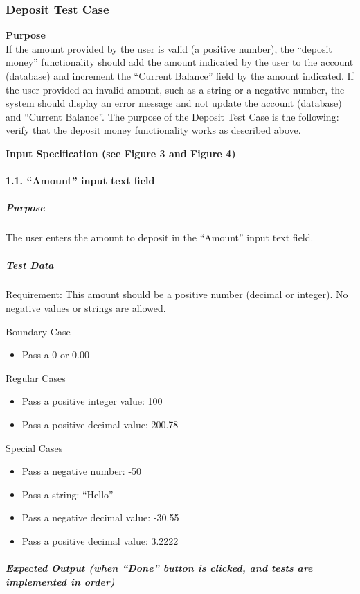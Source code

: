 \documentclass[12pt]{article}
\begin{document}
\subsubsection{Deposit Test Case} \label{tc:1}

\noindent
{\bf Purpose}\\
If the amount provided by the user is valid (a positive number), the ``deposit money'' functionality should add the amount indicated by the user to the account (database) and increment the ``Current Balance'' field by the amount indicated.  If the user provided an invalid amount, such as a string or a negative number, the system should display an error message and not update the account (database) and ``Current Balance''.  The purpose of the Deposit Test Case is the following: verify that the deposit money functionality works as described above.

\noindent
{\bf Input Specification (see Figure 3 and Figure 4)}

\paragraph{1.1. ``Amount'' input text field}
\subparagraph{Purpose} The user enters the amount to deposit in the ``Amount'' input text field.

\subparagraph{Test Data} Requirement: This amount should be a positive number (decimal or integer). No negative values or strings are allowed.

Boundary Case
\begin{itemize}
  \item Pass a 0 or 0.00
\end{itemize}

Regular Cases
\begin{itemize}
  \item Pass a positive integer value: 100
  \item Pass a positive decimal value: 200.78
\end{itemize}

Special Cases
\begin{itemize}
  \item Pass a negative number: -50
  \item Pass a string: ``Hello''
  \item Pass a negative decimal value: -30.55
  \item Pass a positive decimal value: 3.2222
\end{itemize}

\subparagraph{Expected Output (when ``Done'' button is clicked, and tests are implemented in order)}
\end{document}
